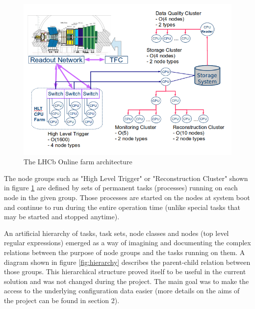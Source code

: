 \documentclass{customization}
\begin{document}
\begin{figure}[H]
    \centering
    \includegraphics[scale=0.5]{images/farm.png}
    \caption{The LHCb Online farm architecture}
    \label{fig:farm}
\end{figure}


\noindent
The node groups such as "High Level Trigger" or "Reconstruction Cluster" shown in figure \ref{fig:farm} are defined by sets of permanent tasks (processes) running on each node in the given group. Those processes are started on the nodes at system boot and continue to run during the entire operation time (unlike special tasks that may be started and stopped anytime).
\newline

\noindent
An artificial hierarchy of tasks, task sets, node classes and nodes (top level regular expressions) emerged as a way of imagining and documenting the complex relations between the purpose of node groups and the tasks running on them. A diagram shown in figure \ref{fig:hierarchy} describes the parent-child relation between those groups. This hierarchical structure proved itself to be useful in the current solution and was not changed during the project. The main goal was to make the access to the underlying configuration data easier (more details on the aims of the project can be found in section 2).
\end{document}
